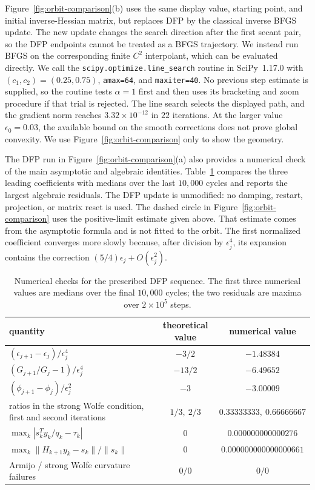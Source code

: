 \documentclass[11pt]{article}
\begin{document}
Figure~\ref{fig:orbit-comparison}(b) uses the same display value, starting
point, and initial inverse-Hessian matrix, but replaces DFP by the classical
inverse BFGS update.  The new update changes the search direction after the
first secant pair, so the DFP endpoints cannot be treated as a BFGS
trajectory.  We instead run BFGS on the corresponding finite $C^2$
interpolant, which can be evaluated directly.  We call the
\texttt{scipy.optimize.line\_search} routine in SciPy~1.17.0
\cite{VirtanenEtAl2020} with
$(c_1,c_2)=(0.25,0.75)$, \texttt{amax=64}, and \texttt{maxiter=40}.  No
previous step estimate is supplied, so the routine tests $\alpha=1$ first and
then uses its bracketing and zoom procedure if that trial is rejected.  The
line search selects the displayed path, and the gradient norm reaches
$3.32\times10^{-12}$ in $22$ iterations.  At the larger value
$\epsilon_0=0.03$, the available bound on the smooth corrections does not
prove global convexity.  We use Figure~\ref{fig:orbit-comparison} only to show
the geometry.

The DFP run in Figure~\ref{fig:orbit-comparison}(a) also provides a numerical
check of the main asymptotic and algebraic identities.  Table~\ref{tab:recurrence-verification}
compares the three leading coefficients with medians over the last $10{,}000$
cycles and reports the largest algebraic residuals.  The DFP update is
unmodified: no damping, restart, projection, or matrix reset is used.  The
dashed circle in Figure~\ref{fig:orbit-comparison} uses the positive-limit
estimate given above.  That estimate comes from the asymptotic formula and is
not fitted to the orbit.  The first normalized coefficient converges more
slowly because, after division by $\epsilon_j^4$, its expansion contains the
correction $(5/4)\epsilon_j+O(\epsilon_j^2)$.

\begin{table}[H]
\caption{Numerical checks for the prescribed DFP sequence.  The first three
numerical values are medians over the final $10{,}000$ cycles; the two
residuals are maxima over $2\times10^5$ steps.}
\label{tab:recurrence-verification}
\centering
\small
\setlength{\tabcolsep}{3.5pt}
\begin{tabular}{@{}p{6.1cm}cc@{}}
\toprule
quantity & theoretical value & numerical value\\
\midrule
$(\epsilon_{j+1}-\epsilon_j)/\epsilon_j^4$
  & $-3/2$ & $-1.48384$\\
$(G_{j+1}/G_j-1)/\epsilon_j^4$
  & $-13/2$ & $-6.49652$\\
$(\phi_{j+1}-\phi_j)/\epsilon_j^2$
  & $-3$ & $-3.00009$\\
ratios in the strong Wolfe condition, first and second iterations
  & $1/3,\ 2/3$ & $0.33333333,\ 0.66666667$\\
$\max_k|s_k^Ty_k/q_k-\tau_k|$
  & $0$ & $0.000000000000276$\\
$\max_k\|H_{k+1}y_k-s_k\|/\|s_k\|$
  & $0$ & $0.000000000000000661$\\
Armijo / strong Wolfe curvature failures
  & $0/0$ & $0/0$\\
\bottomrule
\end{tabular}
\end{table}
\FloatBarrier
\end{document}

